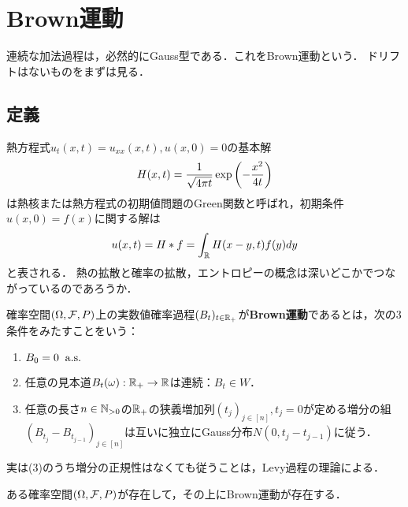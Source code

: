 \documentclass[uplatex,dvipdfmx]{jsreport}
\begin{document}
\section{Brown運動}

\begin{tcolorbox}[colframe=ForestGreen, colback=ForestGreen!10!white,breakable,colbacktitle=ForestGreen!40!white,coltitle=black,fonttitle=\bfseries\sffamily,
title=]
    連続な加法過程は，必然的にGauss型である．これをBrown運動という．
    ドリフトはないものをまずは見る．
\end{tcolorbox}

\subsection{定義}

\begin{tcolorbox}[colframe=ForestGreen, colback=ForestGreen!10!white,breakable,colbacktitle=ForestGreen!40!white,coltitle=black,fonttitle=\bfseries\sffamily,
title=]
    熱方程式$u_t(x,t)=u_{xx}(x,t),u(x,0)=0$の基本解
    \[H(x,t)=\frac{1}{\sqrt{4\pi t}}\exp\left(-\frac{x^2}{4t}\right)\]
    は熱核または熱方程式の初期値問題のGreen関数と呼ばれ，初期条件$u(x,0)=f(x)$に関する解は
    \[u(x,t)=H*f=\int_{\mathbb{R}} H(x-y,t)f(y)dy\]
    と表される．
    熱の拡散と確率の拡散，エントロピーの概念は深いどこかでつながっているのであろうか．
\end{tcolorbox}

\begin{definition}
    確率空間$(\Omega,\mathcal{F},P)$上の実数値確率過程$(B_t)_{t\in\mathbb{R}_+}$が\textbf{Brown運動}であるとは，次の3条件をみたすことをいう：
    \begin{enumerate}
        \item $B_0=0\;\;\mathrm{a.s.}$
        \item 任意の見本道$B_t(\omega):\mathbb{R}_+\to\mathbb{R}$は連続：$B_t\in W$．
        \item 任意の長さ$n\in\mathbb{N}_{>0}$の$\mathbb{R}_+$の狭義増加列$(t_j)_{j\in[n]},t_j=0$が定める増分の組$(B_{t_j}-B_{t_{j-1}})_{j\in[n]}$は互いに独立にGauss分布$N(0,t_{j}-t_{j-1})$に従う．
    \end{enumerate}
\end{definition}
\begin{remarks}
    実は(3)のうち増分の正規性はなくても従うことは，Levy過程の理論による．
\end{remarks}

\begin{theorem}[Brown運動の存在]\label{thm-existence-of-Brownian-motion}
    ある確率空間$(\Omega,\mathcal{F},P)$が存在して，その上にBrown運動が存在する．
\end{theorem}
\end{document}
